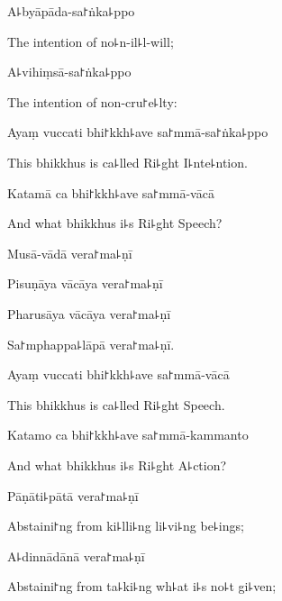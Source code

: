 A꜕byāpāda-sa꜓ṅka꜕ppo

\begin{english}
  The intention of no꜕n-il꜕l-will;
\end{english}

A꜕vihiṃsā-sa꜓ṅka꜕ppo

\begin{english}
  The intention of non-cru꜓e꜕lty:
\end{english}

Ayaṃ vuccati bhi꜓kkh꜕ave sa꜓mmā-sa꜓ṅka꜕ppo

\begin{english}
  This bhikkhus is ca꜕lled Ri꜕ght I꜕nte꜕ntion.
\end{english}

Katamā ca bhi꜓kkh꜕ave sa꜓mmā-vācā

\begin{english}
  And what bhikkhus i꜕s Ri꜕ght Speech?
\end{english}

Musā-vādā vera꜓ma꜕ṇī


Pisuṇāya vācāya vera꜓ma꜕ṇī


Pharusāya vācāya vera꜓ma꜕ṇī


Sa꜓mphappa꜕lāpā vera꜓ma꜕ṇī.


Ayaṃ vuccati bhi꜓kkh꜕ave sa꜓mmā-vācā

\begin{english}
  This bhikkhus is ca꜕lled Ri꜕ght Speech.
\end{english}

Katamo ca bhi꜓kkh꜕ave sa꜓mmā-kammanto

\begin{english}
  And what bhikkhus i꜕s Ri꜕ght A꜕ction?
\end{english}

Pāṇāti꜕pātā vera꜓ma꜕ṇī

\begin{english}
  Abstaini꜓ng from ki꜕lli꜕ng li꜕vi꜕ng be꜕ings;
\end{english}

A꜕dinnādānā vera꜓ma꜕ṇī

\begin{english}
  Abstaini꜓ng from ta꜕ki꜕ng wh꜕at i꜕s no꜕t gi꜕ven;
\end{english}

